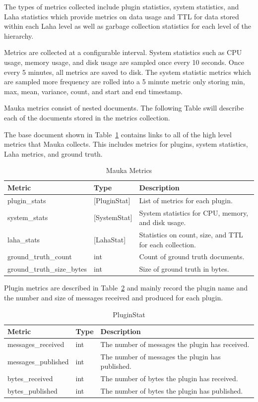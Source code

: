 The types of metrics collected include plugin statistics, system statistics, and Laha statistics which provide metrics on data usage and TTL for data stored within each Laha level as well as garbage collection statistics for each level of the hierarchy.

Metrics are collected at a configurable interval. System statistics such as CPU usage, memory usage, and disk usage are sampled once every 10 seconds. Once every 5 minutes, all metrics are saved to disk. The system statistic metrics which are sampled more frequency are rolled into a 5 minute metric only storing min, max, mean, variance, count, and start and end timestamp.

Mauka metrics consist of nested documents. The following Table swill describe each of the documents stored in the metrics collection.

The base document shown in Table~\ref{table:Metrics} contains links to all of the high level metrics that Mauka collects. This includes metrics for plugins, system statistics, Laha metrics, and ground truth.

\begin{table}[H]
	\centering
	\caption{Mauka Metrics}
	\begin{tabularx}{\textwidth}{llX}
		\toprule
		\textbf{Metric} & \textbf{Type} & \textbf{Description} \\
		\midrule
		plugin\_stats & [PluginStat] & List of metrics for each plugin. \\
		system\_stats & [SystemStat] & System statistics for CPU, memory, and disk usage. \\
		laha\_stats & [LahaStat] & Statistics on count, size, and TTL for each collection. \\
		ground\_truth\_count & int & Count of ground truth documents. \\
		ground\_truth\_size\_bytes & int & Size of ground truth in bytes. \\
		\bottomrule
	\end{tabularx}
	\label{table:Metrics}
\end{table}

Plugin metrics are described in Table~\ref{table:MetricsPluginStat} and mainly record the plugin name and the number and size of messages received and produced for each plugin.

\begin{table}[H]
	\centering
	\caption{PluginStat}
	\begin{tabularx}{\textwidth}{llX}
		\toprule
		\textbf{Metric} & \textbf{Type} & \textbf{Description} \\
		\midrule
		messages\_received & int & The number of messages the plugin has received. \\
		messages\_published & int & The number of messages the plugin has published. \\
		bytes\_received & int & The number of bytes the plugin has received. \\
		bytes\_published & int & The number of bytes the plugin has published. \\
		\bottomrule
	\end{tabularx}
	\label{table:MetricsPluginStat}
\end{table}

